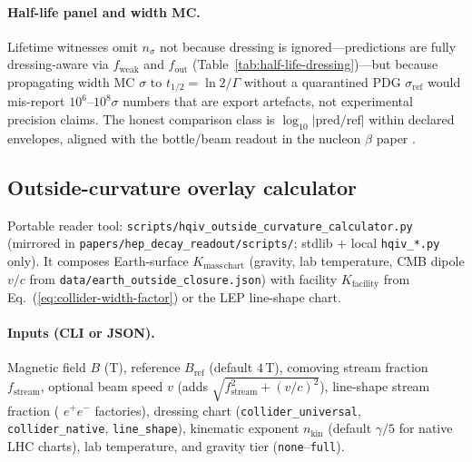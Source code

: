 \documentclass[11pt]{amsart}
\newcommand{\repath}[1]{{\scriptsize\nolinkurl{#1}}}
\begin{document}
\paragraph{Half-life panel and width MC.}
Lifetime witnesses omit $n_\sigma$ not because dressing is ignored---predictions are
fully dressing-aware via $f_{\mathrm{weak}}$ and $f_{\mathrm{out}}$
(Table~\ref{tab:half-life-dressing})---but because propagating width MC $\sigma$ to
$t_{1/2}=\ln 2/\Gamma$ without a quarantined PDG $\sigma_{\mathrm{ref}}$ would
mis-report $10^6$--$10^8\sigma$ numbers that are export artefacts, not experimental
precision claims.
The honest comparison class is $\log_{10}|\mathrm{pred}/\mathrm{ref}|$ within declared
envelopes, aligned with the bottle/beam readout in the nucleon $\beta$ paper
\cite{hqiv-nucleon-binding-paper}.

\subsection{Outside-curvature overlay calculator}
\label{sec:outside-curvature-calculator}

Portable reader tool: \repath{scripts/hqiv_outside_curvature_calculator.py}
(mirrored in \repath{papers/hep_decay_readout/scripts/}; stdlib + local \nolinkurl{hqiv_*.py} only).
It composes Earth-surface $K_{\mathrm{mass\,chart}}$ (gravity, lab temperature, CMB dipole
$v/c$ from \repath{data/earth_outside_closure.json}) with facility
$K_{\mathrm{facility}}$ from Eq.~(\ref{eq:collider-width-factor}) or the LEP line-shape chart.

\paragraph{Inputs (CLI or JSON).}
Magnetic field $B$ (T), reference $B_{\mathrm{ref}}$ (default $4$\,T), comoving stream
fraction $f_{\mathrm{stream}}$, optional beam speed $v$ (adds $\sqrt{f_{\mathrm{stream}}^2+(v/c)^2}$),
line-shape stream fraction ( $e^+e^-$ factories), dressing chart
(\texttt{collider\_universal}, \texttt{collider\_native}, \texttt{line\_shape}),
kinematic exponent $n_{\mathrm{kin}}$ (default $\gamma/5$ for native LHC charts),
lab temperature, and gravity tier (\texttt{none}--\texttt{full}).
\end{document}
